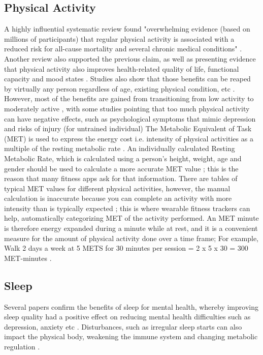 \subsection{Physical Activity}
A highly influential systematic review found "overwhelming evidence (based on millions of participants) that regular physical activity is associated with a reduced risk for all-cause mortality and several chronic medical conditions" \cite{Warburton2017Health}. Another review also supported the previous claim, as well as presenting evidence that physical activity also improves health-related quality of life, functional capacity and mood states \cite{Penedo2005Exercise}. Studies also show that those benefits can be reaped by virtually any person regardless of age, existing physical condition, etc \cite{Penedo2005Exercise, Warburton2017Health}. However, most of the benefits are gained from transitioning from low activity to moderately active \cite{Powell2011Physical}, with some studies pointing that too much physical activity can have negative effects, such as psychological symptoms that mimic depression \cite{Paluska2000Physical} and risks of injury (for untrained individual) \cite{Melzer2004Physical}
The Metabolic Equivalent of Task (MET) is used to express the energy cost i.e. intensity of physical activities as a multiple of the resting metabolic rate \cite{Jetté1990Metabolic}. An individually calculated Resting Metabolic Rate, which is calculated using a person's height, weight, age and gender should be used to calculate a more accurate MET value \cite{Byrne2005Metabolic}; this is the reason that many fitness apps ask for that information. There are tables of typical MET values for different physical activities, however, the manual calculation is inaccurate because you can complete an activity with more intensity than is typically expected \cite{Jetté1990Metabolic}; this is where wearable fitness trackers can help, automatically categorizing MET of the activity performed. An MET minute is therefore energy expanded during a minute while at rest, and it is a convenient measure for the amount of physical activity done over a time frame; For example, Walk 2 days a week at 5 METS for 30 minutes per session = 2 x 5 x 30 = 300 MET-minutes \cite{metMinutes}.
\subsection{Sleep}
Several papers confirm the benefits of sleep for mental health, whereby improving sleep quality had a positive effect on reducing mental health difficulties such as depression, anxiety etc \cite{sleep1, sleep2, sleep3}. Disturbances, such as irregular sleep starts can also impact the physical body, weakening the immune system \cite{sleep4} and changing metabolic regulation \cite{sleep2}.

